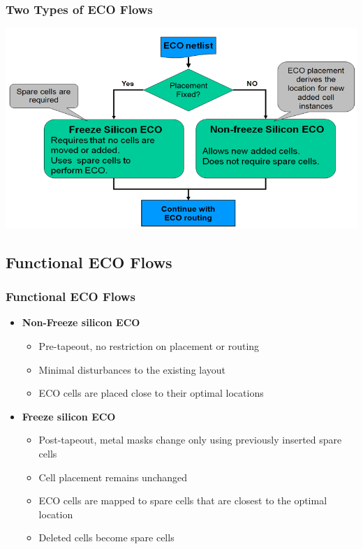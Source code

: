 \documentclass[compress]{beamer}
\begin{document}
\begin{frame}
	\frametitle{Two Types of ECO Flows}
	\begin{center}
		\includegraphics[width=\textwidth]{Types}
	\end{center}
\end{frame}
\subsection[Functional]{Functional ECO Flows}
\begin{frame}
	\frametitle{Functional ECO Flows}
	\begin{itemize}
		\item \textbf{Non-Freeze silicon ECO}
		\begin{itemize}
			\item Pre-tapeout, no restriction on placement or routing
			\item Minimal disturbances to the existing layout
			\item ECO cells are placed close to their optimal locations
		\end{itemize}
		\item \textbf{Freeze silicon ECO}
		\begin{itemize}
			\item Post-tapeout, metal masks change only using previously inserted spare cells
			
			\item Cell placement remains unchanged
			
			\item ECO cells are mapped to spare cells that are closest to the optimal location
			
			\item Deleted cells become spare cells
			
		\end{itemize}
	\end{itemize}
\end{frame}
\end{document}
